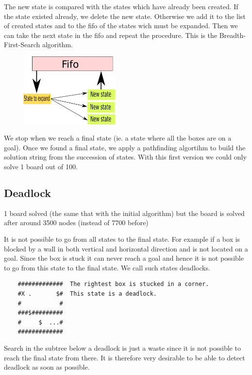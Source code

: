 \documentclass[a4paper,10pt]{article}
\begin{document}
	The new state is compared with the states which have already been created. 
	If the state existed already, we delete the new state.
	Otherwise we add it to the list of created states and to the fifo of the states wich must be expanded.
	Then we can take the next state in the fifo and repeat the procedure.
	This is the Breadth-First-Search algorithm.

	\begin{figure}[h]
	\centerline{\includegraphics[height=5 cm, width=5cm]{./state_fifo.png}}
	\end{figure}

	We stop when we reach a final state (ie. a state where all the boxes are on a goal).
	Once we found a final state, we apply a pathfinding algortihm to build the solution string from the succession of states.
 With this first version we could only solve 1 board out of 100. 

	\subsection{Deadlock}
	1 board solved (the same that with the initial algorithm) but the board is solved after around 3500 nodes (instead of 7700 before)

	It is not possible to go from all states to the final state.  
	For example if a box is blocked by a wall in both vertical and horizontal direction and is not located on a goal.  
	Since the box is stuck it can never reach a goal and hence it is not possible to go from this state to the final state.    
	We call such states deadlocks.

	\begin{verbatim}
	#############  The rightest box is stucked in a corner.
	#X .       $#  This state is a deadlock.
	#           # 
	###$######### 
	#     $  ...# 
	############# 
	\end{verbatim}

        Search in the subtree below a deadlock is just a waste since it is not possible to reach the final state from there.  
        It is therefore very desirable to be able to detect deadlock as soon as possible.
\end{document}
